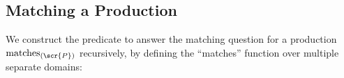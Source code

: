\documentclass[10pt]{article}
\newcommand{\generalsubseq}{\overbar{I}}
\newcommand{\canonicalleftend}{l_1}
\newcommand{\canonicalbookmarkindex}{l^+}
\begin{document}

\subsection{Matching a Production}
\label{sec:matching-a-prod}
We construct the predicate to answer the matching question for a production $\text{matches}_{(\scr{P})}$ recursively, by defining the ``matches'' function over multiple separate domains:
\end{document}

